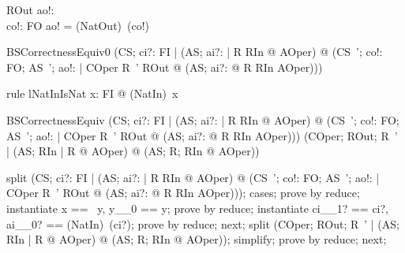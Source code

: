 \begin{schema}{ROut}
   ao!: \nat \\
   co!: FO
\where
   ao! = (NatOut\inv)~(co!)
\end{schema}

\begin{theorem}{BSCorrectnessEquiv0} 
  (\forall CS; ci?: FI  | (\forall AS; ai?: \nat | R \land RIn @ \pre AOper) @
  	(\forall CS~'; co!: FO; AS~'; ao!: \nat | COper \land R~' \land ROut @
  		(\exists AS; ai?: \nat @ R \land RIn \land AOper)))
\end{theorem}


\begin{theorem}{rule lNatInIsNat}
   \forall x: FI @ (NatIn\inv)~x 
\end{theorem}

\begin{theorem}{BSCorrectnessEquiv} 
  (\forall CS; ci?: FI  | (\forall AS; ai?: \nat | R \land RIn @ \pre AOper) @
  	(\forall CS~'; co!: FO; AS~'; ao!: \nat | COper \land R~' \land ROut @
  		(\exists AS; ai?: \nat @ R \land RIn \land AOper)))
  	\iff
  (\forall COper; ROut; R~' | (\forall AS; RIn | R @ \pre AOper) @ (\exists AS; R; RIn @ AOper))
\end{theorem}

\begin{zproof}[BSCorrectnessEquiv]
split (\forall CS; ci?: FI  | (\forall AS; ai?: \nat | R \land RIn @ \pre AOper) @
  	(\forall CS~'; co!: FO; AS~'; ao!: \nat | COper \land R~' \land ROut @
  		(\exists AS; ai?: \nat @ R \land RIn \land AOper)));
cases;
prove by reduce;
instantiate x == \ran~y, y\_\_0 == y;
prove by reduce;
instantiate ci\_\_1? == ci?, ai\_\_0? == (NatIn\inv)~(ci?);
prove by reduce;
next;
split (\forall COper; ROut; R~' | (\forall AS; RIn | R @ \pre AOper) @ (\exists AS; R; RIn @ AOper));
simplify;
prove by reduce;
next;
\end{zproof}
